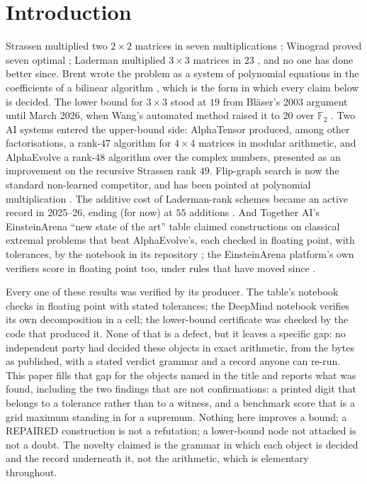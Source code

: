 \documentclass[11pt]{article}
\newcommand{\F}{\mathbb{F}}
\begin{document}
\section{Introduction}

Strassen multiplied two $2\times2$ matrices in seven multiplications \cite{St69}; Winograd proved seven
optimal \cite{Wi71}; Laderman multiplied $3\times3$ matrices in $23$ \cite{La76}, and no one has done better
since. Brent wrote the problem as a system of polynomial equations in the coefficients of a bilinear
algorithm \cite{Br70}, which is the form in which every claim below is decided. The lower bound for
$3\times3$ stood at $19$ from Bl\"aser's 2003 argument \cite{Bl03} until March 2026, when Wang's automated
method raised it to $20$ over $\F_2$ \cite{Wa26}. Two AI systems entered the upper-bound side: AlphaTensor
\cite{Fa22} produced, among other factorisations, a rank-$47$ algorithm for $4\times4$ matrices in modular
arithmetic, and AlphaEvolve \cite{No25} a rank-$48$ algorithm over the complex numbers, presented as an
improvement on the recursive Strassen rank $49$. Flip-graph search \cite{KM22} is now the standard
non-learned competitor, and has been pointed at polynomial multiplication \cite{CK25}. The additive cost of
Laderman-rank schemes became an active record in 2025--26, ending (for now) at $55$ additions \cite{KI26}.
And Together AI's EinsteinArena ``new state of the art'' table claimed constructions on classical extremal
problems that beat AlphaEvolve's, each checked in floating point, with tolerances, by the notebook in its
repository \cite{EA26}; the EinsteinArena platform's own verifiers score in floating point too, under rules
that have moved since \cite{EAP26}.

Every one of these results was verified by its producer. The table's notebook checks in floating point with
stated tolerances; the DeepMind notebook verifies its own decomposition in a cell; the lower-bound certificate was
checked by the code that produced it. None of that is a defect, but it leaves a specific gap: no independent
party had decided these objects in exact arithmetic, from the bytes as published, with a stated verdict
grammar and a record anyone can re-run. This paper fills that gap for the objects named in the title and
reports what was found, including the two findings that are not confirmations: a printed digit that belongs
to a tolerance rather than to a witness, and a benchmark score that is a grid maximum standing in for a
supremum. Nothing here improves a bound; a REPAIRED construction is not a refutation; a lower-bound node not
attacked is not a doubt. The novelty claimed is the grammar in which each object is decided and the record
underneath it, not the arithmetic, which is elementary throughout.
\end{document}
